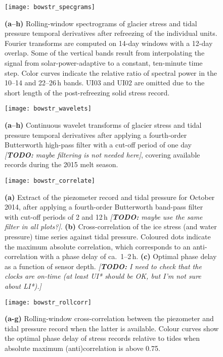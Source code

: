 \documentclass[utf8]{article}
\newcommand{\todo}[1]{\textcolor{c3}{\emph{[\textbf{TODO:} #1]}}}
\begin{document}
    \begin{figure}
      \centerline{\texttt{[image: bowstr\_specgrams]}}
      \caption{%
        \textbf{(a--h)}
          Rolling-window spectrograms of glacier stress and tidal pressure
          temporal derivatives after refreezing of the individual units.
          Fourier transforms are computed on 14-day windows with a 12-day
          overlap. Some of the vertical bands result from interpolating the
          signal from solar-power-adaptive to a constant, ten-minute time step.
          Color curves indicate the relative ratio of spectral power in the
          10--14 and 22--26\,h bands. UI03 and UI02 are omitted due to the
          short length of the post-refreezing solid stress record.}
      \label{fig:specgrams}
    \end{figure}

    \begin{figure}
      \centerline{\texttt{[image: bowstr\_wavelets]}}
      \caption{%
        \textbf{(a--h)}
          Continuous wavelet transforms of glacier stress and tidal pressure
          temporal derivatives after applying a fourth-order Butterworth
          high-pass filter with a cut-off period of one day \todo{maybe
          filtering is not needed here}, covering available records during the
          2015 melt season.}
      \label{fig:wavelets}
    \end{figure}

    \begin{figure}
      \centerline{\texttt{[image: bowstr\_correlate]}}
      \caption{%
        \textbf{(a)}
          Extract of the piezometer record and tidal pressure for October 2014,
          after applying a fourth-order Butterworth band-pass filter with
          cut-off periods of 2 and 12\,h \todo{maybe use the same filter in all
          plots?}.
        \textbf{(b)}
          Cross-correlation of the ice stress (and water pressure) time series
          against tidal pressure. Coloured dots indicate the maximum absolute
          correlation, which corresponds to an anti-correlation with a phase
          delay of ca.~1--2\,h.
        \textbf{(c)}
          Optimal phase delay as a function of sensor depth.
        \todo{
          I need to check that the clocks are on-time (at least UI* should be
          OK, but I'm not sure about LI*).}}
      \label{fig:correlate}
    \end{figure}

    \begin{figure}
      \centerline{\texttt{[image: bowstr\_rollcorr]}}
      \caption{%
        \textbf{(a-g)}
          Rolling-window cross-correlation between the piezometer and tidal
          pressure record when the latter is available. Colour curves show the
          optimal phase delay of stress records relative to tides when absolute
          maximum (anti)correlation is above 0.75.}
      \label{fig:rollcorr}
    \end{figure}


\end{document}
